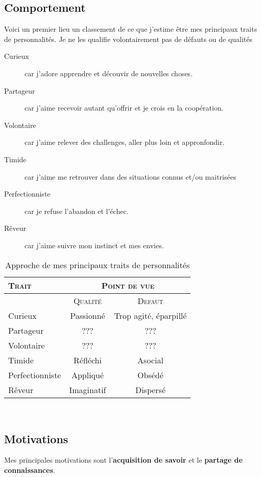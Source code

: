 \documentclass[a4paper,12pt, draft]{report}
\newcommand{\tabTitle}[1]{\hfill{} \textsc{#1} \hfill{} }
\begin{document}
\newpage
\subsection{Comportement}

Voici un premier lieu un classement de ce que j'estime être mes principaux traits de personnalités. Je ne les qualifie volontairement pas de défauts ou de qualités\\

\begin{description}
\item [Curieux]car j'adore apprendre et découvir de nouvelles choses.
\item [Partageur]car j'aime recevoir autant qu'offrir et je crois en la coopération.
\item [Volontaire]car j'aime relever des challenges, aller plus loin et appronfondir.
\item [Timide]car j'aime me retrouver dans des situations connus et/ou maitrisées
\item [Perfectionniste]car je refuse l'abandon et l'échec.
\item [Rêveur]car j'aime suivre mon instinct et mes envies.
\end{description}

\begin{table}[h]
  \begin{tabular}{|l|c|c|}
    \hline

  \tabTitle{Trait} & \multicolumn{2}{c|}{\tabTitle{Point de vue}} \\
\hline
 & \tabTitle{Qualité} & \tabTitle{Defaut} \\
\hline
  Curieux & Passionné & Trop agité, éparpillé \\
  \hline
  Partageur & ??? & ???\\
  \hline
  Volontaire & ??? & ??? \\
  \hline
  Timide & Réfléchi & Asocial \\
  \hline
  Perfectionniste & Appliqué & Obsédé \\
  \hline
  Rêveur & Imaginatif & Dispersé \\
  \hline


    
  \end{tabular}\\
\caption{Approche de mes principaux traits de personnalités}
\end{table}


\subsection{Motivations}
Mes principales motivations sont  l'\textbf{acquisition de savoir} et 
le \textbf{partage de connaissances}. 
\end{document}
